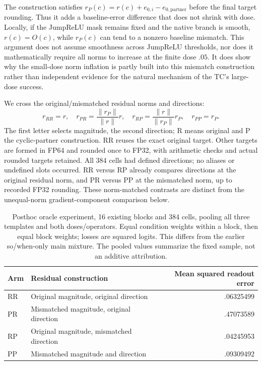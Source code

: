 The construction satisfies $r_P(c)=r(c)+e_{0,i}-e_{0,\mathrm{partner}}$ before the final target rounding. Thus it adds a baseline-error difference that does not shrink with dose. Locally, if the JumpReLU mask remains fixed and the native branch is smooth, $r(c)=O(c)$, while $r_P(c)$ can tend to a nonzero baseline mismatch. This argument does not assume smoothness across JumpReLU thresholds, nor does it mathematically require all norms to increase at the finite dose $.05$. It does show why the small-dose norm inflation is partly built into this mismatch construction rather than independent evidence for the natural mechanism of the TC's large-dose success.

We cross the original/mismatched residual norms and directions:
\[
 r_{RR}=r,\quad r_{PR}=\frac{\|r_P\|}{\|r\|}r,\quad
 r_{RP}=\frac{\|r\|}{\|r_P\|}r_P,\quad r_{PP}=r_P.
\]
The first letter selects magnitude, the second direction; R means original and P the cyclic-partner construction. RR reuses the exact original target. Other targets are formed in FP64 and rounded once to FP32, with arithmetic checks and actual rounded targets retained. All 384 cells had defined directions; no aliases or undefined slots occurred. RR versus RP already compares directions at the original residual norm, and PR versus PP at the mismatched norm, up to recorded FP32 rounding. These norm-matched contrasts are distinct from the unequal-norm gradient-component comparison below.

\begin{table}[ht]\centering\small
\begin{tabular}{llr}\toprule Arm & Residual construction & Mean squared readout error\\\midrule
RR & Original magnitude, original direction & .06325499\\
PR & Mismatched magnitude, original direction & .47073589\\
RP & Original magnitude, mismatched direction & .04245953\\
PP & Mismatched magnitude and direction & .09309492\\\bottomrule
\end{tabular}
\caption{Posthoc oracle experiment, 16 existing blocks and 384 cells, pooling all three templates and both doses/operators. Equal condition weights within a block, then equal block weights; losses are squared logits. This differs from the earlier so/when-only main mixture. The pooled values summarize the fixed sample, not an additive attribution.}\label{tab:crossgeometry}
\end{table}

